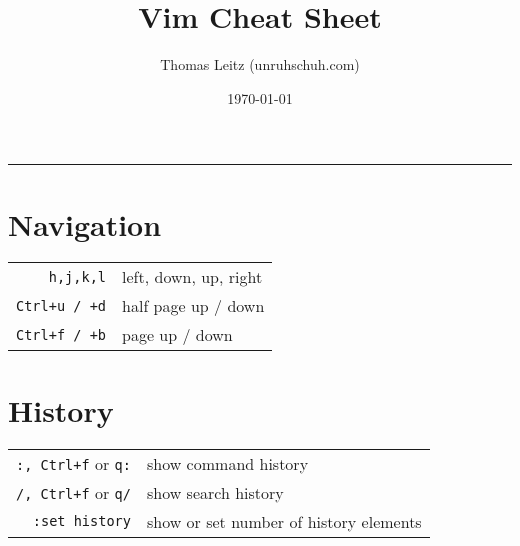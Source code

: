 

\title{Vim Cheat Sheet}
\author{Thomas Leitz (unruhschuh.com)}
\date{\today}



\raggedcolumns

\begin{multicols*}{3}
  
\maketitle
\hrule
\centering
\section*{Navigation}
\begin{tabular}{@{}rl@{}}
\verb|h,j,k,l|     & left, down, up, right \\
\verb|Ctrl+u / +d| & half page up / down \\
\verb|Ctrl+f / +b| & page up / down
\end{tabular}

\section*{History}
\begin{tabular}{@{}rl@{}}
\verb|:, Ctrl+f| or \verb|q:| & show command history \\
\verb|/, Ctrl+f| or \verb|q/| & show search history \\
\verb|:set history| & show or set number of history elements
\end{tabular}


\end{multicols*}
